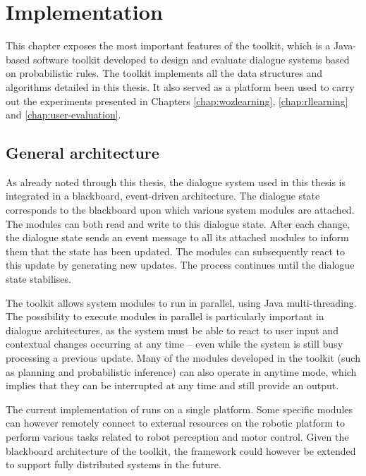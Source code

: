 \chapter{Implementation}
\label{chap:opendial}


This chapter exposes the most important features of the \opendial toolkit, which is a Java-based software toolkit developed to design and evaluate dialogue systems based on probabilistic rules. The toolkit implements all the data structures and algorithms detailed in this thesis.  It also served as a platform been used to carry out the experiments presented in Chapters \ref{chap:wozlearning}, \ref{chap:rllearning} and \ref{chap:user-evaluation}. 

\section{General architecture}

As already noted through this thesis, the dialogue system used in this thesis is integrated in a blackboard, event-driven architecture. The dialogue state corresponds to the blackboard upon which various system modules are attached.  The modules can both read and write to this dialogue state.  After each change, the dialogue state sends an event message to all its attached modules to inform them that the state has been updated. The modules can subsequently react to this update by generating new updates.  The process continues until the dialogue state stabilises.  

The \opendial toolkit allows system modules to run in parallel, using Java multi-threading. The possibility to execute modules in parallel is particularly important in dialogue architectures, as the system must be able to react to user input and contextual changes occurring at any time -- even while the system is still busy processing a previous update.  Many of the modules developed in the toolkit (such as planning and probabilistic inference) can also operate in anytime mode, which implies that they can be interrupted at any time and still provide an output. 

The current implementation of \opendial runs on a single platform.  Some specific modules can however remotely connect to external resources on the robotic platform to perform various tasks related to robot perception and motor control. Given the blackboard architecture of the toolkit, the framework could however be extended to support fully distributed systems in the future.

